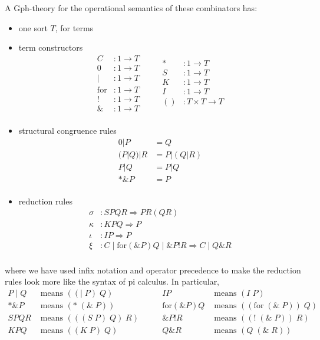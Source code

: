 \documentclass[a4paper,UKenglish]{lipics-v2016}
\newcommand{\for}{\mathrm{for }}
\begin{document}
A Gph-theory for the operational semantics of these combinators has:
\begin{itemize}
  \item one sort $T$, for terms
  \item term constructors
    \[\begin{array}{rl}
      C &: 1 \to T \\ 
      0 &: 1 \to T \\ 
      | &: 1 \to T \\ 
      \for &: 1 \to T \\ 
      ! &: 1 \to T \\ 
      \& &: 1 \to T \\ 
    \end{array}\quad\quad
    \begin{array}{rl}
      * &: 1 \to T \\ 
      S &: 1 \to T \\ 
      K &: 1 \to T \\ 
      I &: 1 \to T \\ 
      () &: T \times T \to T \\ 
    \end{array}\]
  \item structural congruence rules
    \[\begin{array}{rl}
      0|P &= Q \\
      (P|Q)|R &= P|(Q|R) \\
      P|Q &= P|Q \\
      *\&P &= P \\
    \end{array}\]
  \item reduction rules
    \[\begin{array}{rl}
      \sigma &: SPQR \Rightarrow PR(QR) \\ 
      \kappa &: KPQ \Rightarrow P \\ 
      \iota &: IP \Rightarrow P \\ 
      \xi &: C\;|\;\for(\&P)Q\;|\;\&P!R \Rightarrow C\;|\;Q\&R \\ 
    \end{array}\]
\end{itemize}
where we have used infix notation and operator precedence to make the reduction rules look more like the syntax of pi calculus.  In particular, 
\[\begin{array}{rl}
  P\;|\;Q &\mbox{ means } ((|\; P)\; Q)\\
  *\&P &\mbox{ means } (*\; (\&\; P))\\  
  SPQR &\mbox{ means } (((S\; P)\; Q)\; R)\\
  KPQ &\mbox{ means } ((K\; P)\; Q)\\
\end{array}\quad\quad
\begin{array}{rl}
  IP &\mbox{ means } (I\; P)\\
  \for(\&P)Q &\mbox{ means } ((\for\; (\&\; P))\; Q)\\
  \&P!R &\mbox{ means } ((!\; (\&\; P))\; R)\\
  Q\&R &\mbox{ means } (Q\; (\&\; R))\\
\end{array}\]
\end{document}
